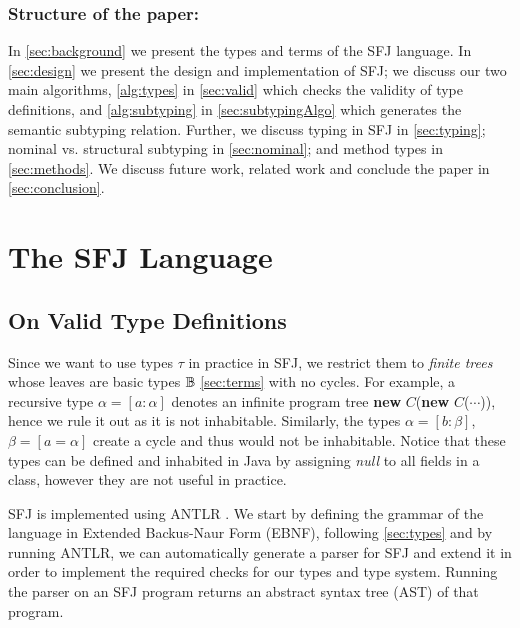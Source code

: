 \documentclass[runningheads]{llncs}
\begin{document}

\subsubsection{Structure of the paper:}
In \autoref{sec:background} we present the types and terms of the SFJ language.
In \autoref{sec:design} we present the design and implementation of SFJ; we discuss our two main algorithms, \autoref{alg:types} in \autoref{sec:valid} which checks the validity of type definitions, and \autoref{alg:subtyping} in \autoref{sec:subtypingAlgo} which generates the semantic subtyping relation. Further, we discuss typing in SFJ in \autoref{sec:typing}; nominal vs. structural subtyping in \autoref{sec:nominal}; and method types in \autoref{sec:methods}.
We discuss future work, related work and conclude the paper in \autoref{sec:conclusion}.



\section{The SFJ Language}
\label{sec:design}
\subsection{On Valid Type Definitions}
\label{sec:valid}
Since we want to use types $\tau$ in practice in SFJ, we restrict them to \emph{finite trees} whose leaves are basic types ${\mathbb B}$ \autoref{sec:terms} with no cycles.
For example, a recursive type $\alpha = [a : \alpha]$ denotes an infinite program tree \textbf{new} $C$(\textbf{new} $C$($\cdots{}$)), hence we rule it out as it is not inhabitable.
Similarly, the types $\alpha = [b: \beta]$, $\beta = [a = \alpha]$ create a cycle and thus would not be inhabitable.
Notice that these types can be defined and inhabited in Java by assigning \emph{null} to all fields in a class, however they are not useful in practice.

SFJ is implemented using ANTLR \cite{parr2013}.
We start by defining the grammar of the language in Extended Backus-Naur Form (EBNF), following \autoref{sec:types} and by running ANTLR, we can automatically generate a parser for SFJ and extend it in order to implement the required checks for our types and type system.
Running the parser on an SFJ program returns an abstract syntax tree (AST) of that program.
\end{document}
